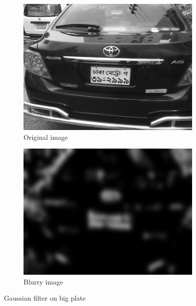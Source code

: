 \begin{figure}
\begin{subfigure}{0.5\textwidth}
    \centering
    \includegraphics[width=0.9\linewidth]{./img/experiment/stage.2/angle3}
    \caption{Original image}
\end{subfigure}
\begin{subfigure}{0.5\textwidth}
    \centering
    \includegraphics[width=0.9\linewidth]{./img/experiment/stage.4/angle3}
    \caption{Blurry image}
\end{subfigure}
\caption{Gaussian filter on big plate}
\label{fig:GaussianResult2}
\end{figure}

